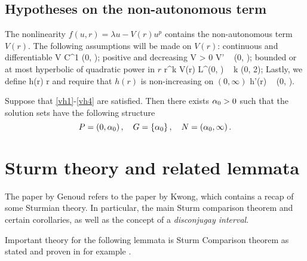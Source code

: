 \subsection{Hypotheses on the non-autonomous term}
The nonlinearity $f(u, r) = \lambda u - V(r) u^p$ contains the non-autonomous
term $V(r)$. The following assumptions will be made on $V(r)$: continuous and
differentiable
\be \label{vh1} 
    V \in C^1 (0, \infty); 
\ee
positive and decreasing
\be \label{vh2} 
    V > 0 \quad {} \quad V'  \quad {} ~ (0, \infty);
\ee
bounded or at most hyperbolic of quadratic power in $r$
\be \label{vh3}
    r^k V(r) \in L^\infty (0, \infty) \quad {} ~ k \in (0, 2);
\ee
Lastly, we define
\be \label{hdef} h(r) \coloneqq r  \ee
and require that $h(r)$ is non-increasing on $(0, \infty)$ 
\be \label{vh4} h'(r)  \quad {} ~ (0, \infty). \ee

\begin{theorem} \label{genmain}
Suppose that \eqref{vh1}-\eqref{vh4} are satisfied. Then there exists $\alpha_0>0$ such
that the solution sets have the following structure
\[
P = \left( 0, \alpha_0 \right), \quad G = \left\{ \alpha_0 \right\}, \quad N =
\left( \alpha_0, \infty \right).
\]
\end{theorem}

\section{Sturm theory and related lemmata}
The paper by Genoud refers to the paper by Kwong, which contains a recap of some
Sturmian theory. In particular, the main Sturm comparison theorem and certain
corollaries, as well as the concept of a \emph{disconjugay interval}.

Important theory for the following lemmata is Sturm Comparison theorem as stated
and proven in for example \cite[p.~246]{kwong}.


